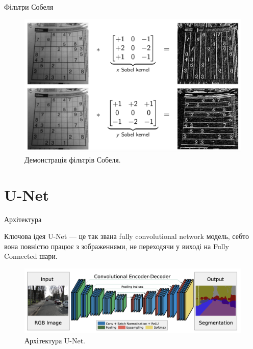 \documentclass{zkdl-presentation-template}
\begin{document}
    \begin{frame}{Фільтри Собеля}
        \begin{figure}
            \centering
            \includegraphics[width=\textwidth]{images/sobel.png}
            \caption{Демонстрація фільтрів Собеля.}
        \end{figure}
    \end{frame}

    \section{U-Net}

    \begin{frame}{Архітектура}
        \begin{block}{Ключова ідея}
            U-Net --- це так звана fully convolutional network модель, себто вона повністю 
            працює з зображеннями, не переходячи у виході на Fully Connected шари.
        \end{block}
        \begin{figure}
            \centering
            \includegraphics[width=\textwidth]{images/unet.png}
            \caption{Архітектура U-Net.}
        \end{figure}
    \end{frame}
\end{document}
